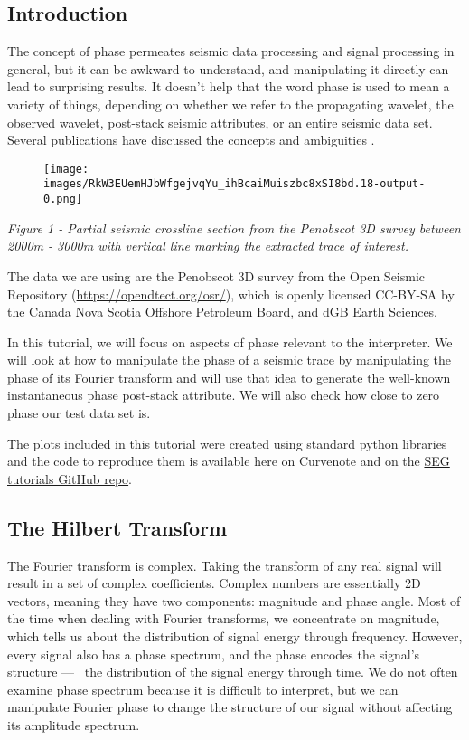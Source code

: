 \subsection*{Introduction}

The concept of phase permeates seismic data processing and signal processing in general, but it can be awkward to understand, and manipulating it directly can lead to surprising results. It doesn’t help that the word phase is used to mean a variety of things, depending on whether we refer to the propagating wavelet, the observed wavelet, post-stack seismic attributes, or an entire seismic data set. Several publications have discussed the concepts and ambiguities \citep{Roden1999significance, Liner2002Phase, 2002Tutorial}.



  \begin{figure}[ht]
    \centering
    \texttt{[image: images/RkW3EUemHJbWfgejvqYu\_ihBcaiMuiszbc8xSI8bd.18-output-0.png]}
  \end{figure}


\textit{Figure 1 - Partial seismic crossline section from the Penobscot 3D survey between 2000m - 3000m with vertical line marking the extracted trace of interest.}

The data we are using are the Penobscot 3D \citep{Purves2014Phase} survey from the Open Seismic Repository (\url{https://opendtect.org/osr/}), which is openly licensed CC-BY-SA by the Canada Nova Scotia Offshore Petroleum Board, and dGB Earth Sciences.

In this tutorial, we will focus on aspects of phase relevant to the interpreter. We will look at how to manipulate the phase of a seismic trace by manipulating the phase of its Fourier transform and will use that idea to generate the well-known instantaneous phase post-stack attribute. We will also check how close to zero phase our test data set is.

The plots included in this tutorial were created using standard python libraries and the code to reproduce them is available here on Curvenote and on the \href{https://github.com/seg/tutorials-2014/tree/master/1410_Phase}{SEG tutorials GitHub repo}.

\subsection*{The Hilbert Transform}

The Fourier transform is complex. Taking the transform of any real signal will result in a set of complex coefficients. Complex numbers are essentially 2D vectors, meaning they have two components: magnitude and phase angle. Most of the time when dealing with Fourier transforms, we concentrate on magnitude, which tells us about the distribution of signal energy through frequency. However, every signal also has a phase spectrum, and the phase encodes the signal’s structure —  the distribution of the signal energy through time. We do not often examine phase spectrum because it is difficult to interpret, but we can manipulate Fourier phase to change the structure of our signal without affecting its amplitude spectrum.

